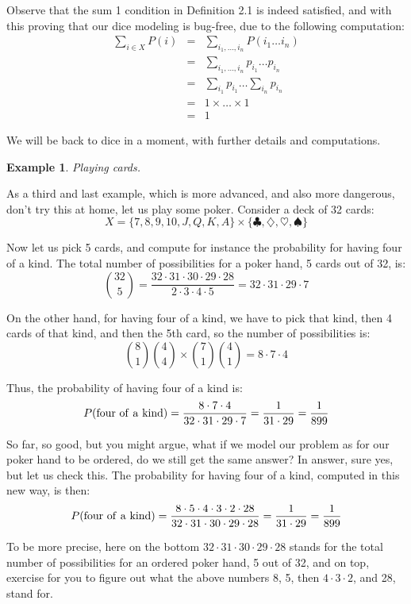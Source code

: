 \documentclass[12pt]{amsbook}
\newtheorem{example}[theorem]{Example}
\begin{document}
Observe that the sum 1 condition in Definition 2.1 is indeed satisfied, and with this proving that our dice modeling is bug-free, due to the following computation:
\begin{eqnarray*}
\sum_{i\in X}P(i)
&=&\sum_{i_1,\ldots,i_n}P(i_1\ldots i_n)\\
&=&\sum_{i_1,\ldots,i_n}p_{i_1}\ldots p_{i_n}\\
&=&\sum_{i_1}p_{i_1}\ldots\sum_{i_n}p_{i_n}\\
&=&1\times\ldots\times 1\\
&=&1
\end{eqnarray*}

We will be back to dice in a moment, with further details and computations.

\begin{example}
Playing cards.
\end{example}

As a third and last example, which is more advanced, and also more dangerous, don't try this at home, let us play some poker. Consider a deck of 32 cards: 
$$X=\{7,8,9,10,J,Q,K,A\}\times\{\clubsuit,\diamondsuit,\heartsuit,\spadesuit\}$$

Now let us pick 5 cards, and compute for instance the probability for having four of a kind. The total number of possibilities for a poker hand, 5 cards out of 32, is:
$$\binom{32}{5}
=\frac{32\cdot 31\cdot 30\cdot 29\cdot 28}{2\cdot 3\cdot 4\cdot 5}
=32\cdot 31\cdot 29\cdot 7$$

On the other hand, for having four of a kind, we have to pick that kind, then 4 cards of that kind, and then the 5th card, so the number of possibilities is:
$$\binom{8}{1}\binom{4}{4}\times\binom{7}{1}\binom{4}{1}
=8\cdot 7\cdot 4$$

Thus, the probability of having four of a kind is:
$$P({\rm four\ of\ a\ kind})
=\frac{8\cdot 7\cdot 4}{32\cdot 31\cdot 29\cdot 7}
=\frac{1}{31\cdot 29}
=\frac{1}{899}$$

So far, so good, but you might argue, what if we model our problem as for our poker hand to be  ordered, do we still get the same answer? In answer, sure yes, but let us check this. The probability for having four of a kind, computed in this new way, is then:
$$P({\rm four\ of\ a\ kind})
=\frac{8\cdot 5\cdot 4\cdot 3\cdot 2\cdot 28}{32\cdot 31\cdot 30\cdot 29\cdot 28}
=\frac{1}{31\cdot 29}
=\frac{1}{899}$$

To be more precise, here on the bottom $32\cdot 31\cdot 30\cdot 29\cdot 28$ stands for the total number of possibilities for an ordered poker hand, 5 out of 32, and on top, exercise for you to figure out what the above numbers 8, 5, then $4\cdot3\cdot2$, and 28, stand for.
\end{document}

